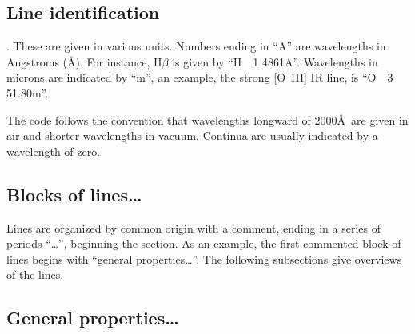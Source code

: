 \subsection{Line identification}

.  These are given in various units.
Numbers ending
in ``A'' are wavelengths in Angstroms (\AA ).
For instance, H$\beta$ is given by ``H~~1  4861A''.
Wavelengths in microns are indicated by ``m'', an example,
the strong [O~III] IR line, is ``O~~3 51.80m''.

The code follows the convention that wavelengths longward of 2000\AA\
are given in air and shorter wavelengths in vacuum.
Continua are usually
indicated by a wavelength of zero.

\subsection{Blocks of lines\dots}

Lines are organized by common origin with a comment, ending in a series
of periods ``\dots'', beginning the section.
As an example, the first
commented block of lines begins with ``general properties\dots''.
The
following subsections give overviews of the lines.

\subsection{General properties\dots}

